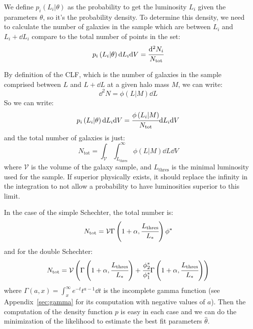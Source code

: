 We define $p_i\left({L_i|\theta}\right)$ as the probability to get the luminosity $L_i$
given the parameters $\theta$, so it's the probability density. To determine
this density, we need to calculate the number of galaxies in the sample which
are between $L_i$ and $L_i+\dd{L_i}$ compare to the total number of points in
the set:
%
\begin{equation}
    p_i\left({L_i|\theta}\right){\rm{d}}{L_i}{\rm{d}}{V} = \cfrac{{\rm{d}}^2{N_i}}{N_{\mathrm{tot}}}
\end{equation}

By definition of the CLF, which is the number of galaxies in the sample
comprised between $L$ and $L+\dd{L}$ at a given halo mass $M$, we can write:
%
\begin{equation}
    \dd^2{N}=\phi\left({L|M}\right)\dd{L}
\end{equation}
%
So we can write:
%
\begin{equation}
    p_i\left({L_i|\theta}\right){\rm{d}}{L_i}{\rm{d}}{V} =
    \cfrac{\phi\left({L_i|M}\right)}{N_{\mathrm{tot}}}{\rm{d}}{L_i}{\rm{d}}{V}
\end{equation}
%
and the total number of galaxies is just:
%
\begin{equation}
    N_{\mathrm{tot}}=\int_\mathcal{V}\int_{L_{\mathrm{thres}}}^\infty{\phi\left({L|M}\right)\dd{L}}\dd{V}
\end{equation}
%
where $\mathcal{V}$ is the volume of the galaxy sample, and
$L_\mathrm{thres}$ is the minimal luminosity used for the sample. If
superior physically exists, it should replace the infinity in the
integration to not allow a probability to have luminosities superior to this
limit.

In the case of the simple Schechter, the total number is:
%
\begin{equation}
    N_{\mathrm{tot}}=\mathcal{V} \Gamma\left(1+\alpha,
        \cfrac{L_\mathrm{thres}}{L_*}\right)\phi^*
\end{equation}
%
and for the double Schechter:
%
\begin{equation}
    N_{\mathrm{tot}}=\mathcal{V} \left(\Gamma\left(1+\alpha,
    \cfrac{L_\mathrm{thres}}{L_*}\right) + \cfrac{\phi_2^*}{\phi_1^*}
    \Gamma\left(1+\alpha, \cfrac{L_\mathrm{thres}}{L_*}\right)\right)
\end{equation}
%
where $\Gamma\left(a,x\right)=\int_x^{\infty}e^{-t}{t^{a-1}}\dd{t}$ is the
incomplete gamma function (see Appendix~\ref{sec:gamma} for its computation
with negative values of $a$). Then the computation of the density function
$p$ is easy in each case and we can do the minimization of the likelihood to
estimate the best fit parameters $\hat{\theta}$.

